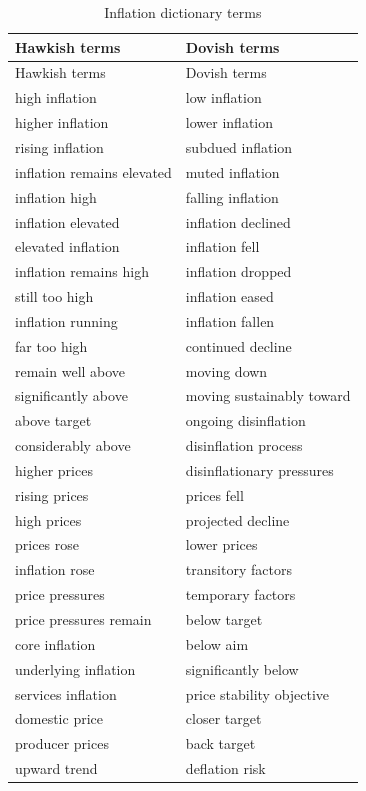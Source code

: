 \begin{longtable}{p{}p{}}
\caption{Inflation dictionary terms}\label{tab:a1_inflation_terms}\\
\toprule
Hawkish terms & Dovish terms \\
\midrule
\endfirsthead
\toprule
Hawkish terms & Dovish terms \\
\midrule
\endhead
high inflation & low inflation \\
higher inflation & lower inflation \\
rising inflation & subdued inflation \\
inflation remains elevated & muted inflation \\
inflation high & falling inflation \\
inflation elevated & inflation declined \\
elevated inflation & inflation fell \\
inflation remains high & inflation dropped \\
still too high & inflation eased \\
inflation running & inflation fallen \\
far too high & continued decline \\
remain well above & moving down \\
significantly above & moving sustainably toward \\
above target & ongoing disinflation \\
considerably above & disinflation process \\
higher prices & disinflationary pressures \\
rising prices & prices fell \\
high prices & projected decline \\
prices rose & lower prices \\
inflation rose & transitory factors \\
price pressures & temporary factors \\
price pressures remain & below target \\
core inflation & below aim \\
underlying inflation & significantly below \\
services inflation & price stability objective \\
domestic price & closer target \\
producer prices & back target \\
upward trend & deflation risk \\

\end{longtable}
